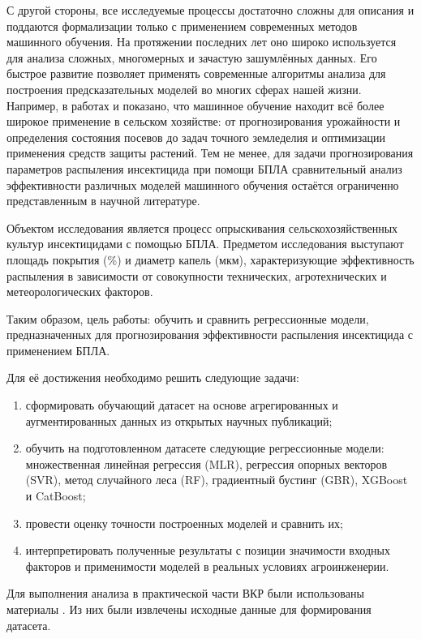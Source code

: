 С другой стороны, все исследуемые процессы достаточно сложны для описания и поддаются формализации только с применением современных методов машинного обучения. На протяжении последних лет оно широко используется для анализа сложных, многомерных и зачастую зашумлённых данных. Его быстрое развитие позволяет применять современные алгоритмы анализа для построения предсказательных моделей во многих сферах нашей жизни. Например, в работах \cite{Liakos2018} и \cite{Jordan2015} показано, что машинное обучение находит всё более широкое применение в сельском хозяйстве: от прогнозирования урожайности и определения состояния посевов до задач точного земледелия и оптимизации применения средств защиты растений. Тем не менее, для задачи прогнозирования параметров распыления инсектицида при помощи БПЛА сравнительный анализ эффективности различных моделей машинного обучения остаётся ограниченно представленным в научной литературе.


Объектом исследования является процесс опрыскивания сельскохозяйственных культур инсектицидами с помощью БПЛА. Предметом исследования выступают площадь покрытия (\%) и диаметр капель (мкм), характеризующие эффективность распыления в зависимости от совокупности технических, агротехнических и метеорологических факторов.


Таким образом, цель работы: обучить и сравнить регрессионные модели, предназначенных для прогнозирования эффективности распыления инсектицида с применением БПЛА.


Для её достижения необходимо решить следующие задачи:

\begin{enumerate}
	\item сформировать обучающий датасет на основе агрегированных и аугментированных данных из открытых научных публикаций;
	\item обучить на подготовленном датасете следующие регрессионные модели: множественная линейная регрессия (MLR), регрессия опорных векторов (SVR), метод случайного леса (RF), градиентный бустинг (GBR), XGBoost и CatBoost;
	\item провести оценку точности построенных моделей и сравнить их;
	\item интерпретировать полученные результаты с позиции значимости входных факторов и применимости моделей в реальных условиях агроинженерии.
\end{enumerate}


Для выполнения анализа в практической части ВКР были использованы материалы \cite{Wu2025, Liu2025, Vitoria2022, Lopes2023, Biglia2022}. Из них были извлечены исходные данные для формирования датасета.



